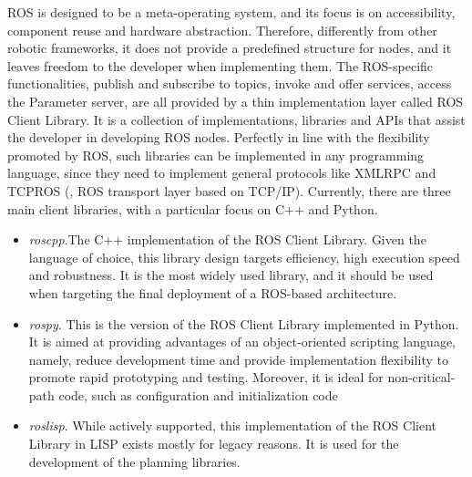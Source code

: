 ROS is designed to be a meta-operating system, and its focus is on accessibility, component reuse and hardware abstraction. Therefore, differently from other robotic frameworks, it does not provide a predefined structure for nodes, and it leaves freedom to the developer when implementing them. The ROS-specific functionalities, publish and subscribe to topics, invoke and offer services, access the Parameter server, are all provided by a thin implementation layer called ROS Client Library. It is a collection of implementations, libraries and APIs that assist the developer in developing ROS nodes. Perfectly in line with the flexibility promoted by ROS, such libraries can be implemented in any programming language, since they need to implement general protocols like XMLRPC and TCPROS (\ie, ROS transport layer based on TCP/IP). Currently, there are three main client libraries, with a particular focus on C++ and Python.
\begin{itemize}
\item \textit{roscpp}.The C++ implementation of the ROS Client Library. Given the language of choice, this library design targets efficiency, high execution speed and robustness. It is the most widely used library, and it should be used when targeting the final deployment of a ROS-based architecture. 
\item \textit{rospy}. This is the version of the ROS Client Library implemented in Python. It is aimed at providing advantages of an object-oriented scripting language, namely, reduce development time and provide implementation flexibility to promote rapid prototyping and testing. Moreover, it is ideal for non-critical-path code, such as configuration and initialization code
\item \textit{roslisp}. While actively supported, this implementation of the ROS Client Library in LISP exists mostly for legacy reasons. It is used for the development of the planning libraries. 
\end{itemize}

